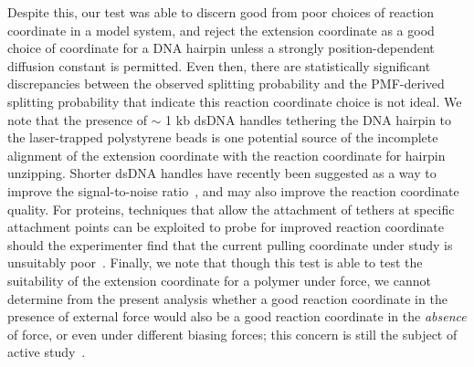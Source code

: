 \documentclass[aps,prl,twocolumn,superscriptaddress,floatfix]{revtex4-1}
\begin{document}
Despite this, our test was able to discern good from poor choices of reaction coordinate in a model system, and reject the extension coordinate as a good choice of coordinate for a DNA hairpin unless a strongly position-dependent diffusion constant is permitted.
Even then, there are statistically significant discrepancies between the observed splitting probability and the PMF-derived splitting probability that indicate this reaction coordinate choice is not ideal. 
We note that the presence of $\sim$ 1 kb dsDNA handles tethering the DNA hairpin to the laser-trapped polystyrene beads is one potential source of the incomplete alignment of the extension coordinate with the reaction coordinate for hairpin unzipping.
Shorter dsDNA handles have recently been suggested as a way to improve the signal-to-noise ratio~\cite{ritort:biophys-j:2011:short-handles}, and may also improve the reaction coordinate quality.
For proteins, techniques that allow the attachment of tethers at specific attachment points can be exploited to probe for improved reaction coordinate should the experimenter find that the current pulling coordinate under study is unsuitably poor~\cite{marqusee-bustamante:eur-biophys-j:2008:protein-optical-tweezers}.
\color{black}
Finally, we note that though this test is able to test the suitability of the extension coordinate for a polymer under force, we cannot determine from the present analysis whether a good reaction coordinate in the presence of external force would also be a good reaction coordinate in the \emph{absence} of force, or even under different biasing forces; this concern is still the subject of active study~\cite{nummela-andricioaei:2007:biophys-j:low-force-kinetics,best-paci-hummer-dudko:2008:jpcb:pulling-reaction-coordinate}.

\end{document}
